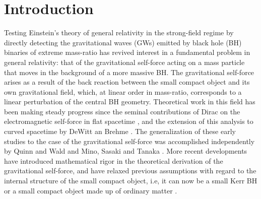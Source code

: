 %
\def\ie{{\it i.e.}}  \def\eg{{\it e.g.}}
\def\lap{\hbox{${_{\displaystyle<}\atop^{\displaystyle\sim}}$}}
\def\gap{\hbox{${_{\displaystyle>}\atop^{\displaystyle\sim}}$}}
\def\lesssim{\mathrel{\hbox{\rlap{\hbox{\lower4pt\hbox{$\sim$}}}\hbox{$<$}}}}
\def\gtrsim{\mathrel{\hbox{\rlap{\hbox{\lower4pt\hbox{$\sim$}}}\hbox{$>$}}}}
\def\alt{\mathrel{\hbox{\rlap{\hbox{\lower4pt\hbox{$\sim$}}}\hbox{$<$}}}}
\def\agt{\mathrel{\hbox{\rlap{\hbox{\lower4pt\hbox{$\sim$}}}\hbox{$>$}}}}
\def\PRD{{\it Phys. Rev.} D~}
\def\PRL{{\it Phys.Rev.} Lett~}
\def\apjl{{\it Astrophys. J.} Lett~}
\def\Msun{M_\odot}
\def\PR{{\it Phys. Rev.}}
\def\CQG{{\it Class. Quantum Grav.}}
\def\aaps{{\it A\&AS~ }}
\def\pasj{{\it PASJ }}
\def\mnras{{\it MNRAS}} 
\def\gta{\ifmmode {\mathbin{\lower 3pt\hbox   %
    {$\,\rlap{\raise 5pt\hbox{$\char'076$}}\mathchar"7218\,$}}}
    \else {${\mathbin{\lower 3pt\hbox
    {$\rlap{\raise 5pt\hbox{$\char'076$}}\mathchar"7218\,$}}}
    $}\fi}
\def\lta{\ifmmode {\,\mathbin{\lower 3pt\hbox   %
    {$\,\rlap{\raise 5pt\hbox{$\char'074$}}\mathchar"7218\,$}}}
    \else {${\mathbin{\lower 3pt\hbox
    {$\rlap{\raise 5pt\hbox{$\char'074$}}\mathchar"7218\,$}}}
    $}\fi}

    


\section{Introduction}    

Testing Einstein's theory of general relativity in the strong-field regime by directly detecting the gravitational waves (GWs) emitted by black hole (BH) binaries of extreme mass-ratio has revived interest in a fundamental problem in general relativity: that of the gravitational self-force acting on a mass particle that moves in the background of a more massive BH. The gravitational self-force arises as  a result of the back reaction between the  small compact object and its own gravitational field, which, at linear order in mass-ratio, corresponds to a linear perturbation of the central BH geometry. Theoretical work in this field has been making steady progress since the seminal contributions of Dirac on the electromagnetic self-force in flat spacetime \cite{dirac}, and the extension of this analysis to curved spacetime by DeWitt an Brehme \cite{dewitt}.   The generalization of these early studies to the case of the gravitational self-force was accomplished independently by Quinn and Wald \cite{qwald} and 
Mino, Sasaki and Tanaka \cite{mino}. More recent developments have introduced mathematical rigor in the theoretical derivation of the gravitational self-force, and have relaxed previous assumptions with regard to the internal structure of the small compact object, i.e, it can now be a small Kerr BH or a small compact object made up of ordinary matter \cite{grallaI,grallaII}. 


